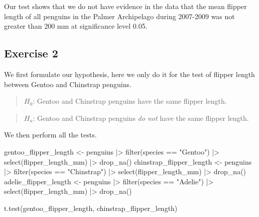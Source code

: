 \documentclass[
  letterpaper,
  DIV=11,
  numbers=noendperiod]{scrreprt}
\newenvironment{Shaded}{\begin{snugshade}}{\end{snugshade}}
\newcommand{\FunctionTok}[1]{\textcolor[rgb]{0.28,0.35,0.67}{#1}}
\newcommand{\NormalTok}[1]{\textcolor[rgb]{0.00,0.23,0.31}{#1}}
\newcommand{\OtherTok}[1]{\textcolor[rgb]{0.00,0.23,0.31}{#1}}
\newcommand{\SpecialCharTok}[1]{\textcolor[rgb]{0.37,0.37,0.37}{#1}}
\newcommand{\StringTok}[1]{\textcolor[rgb]{0.13,0.47,0.30}{#1}}
\begin{document}
Our test shows that we do not have evidence in the data that the mean
flipper length of all penguins in the Palmer Archipelago during
2007-2009 was not greater than 200 mm at significance level 0.05.

\subsection{Exercise 2}\label{exercise-2-17}

We first formulate our hypothesis, here we only do it for the test of
flipper length between Gentoo and Chinstrap penguins.

\begin{quote}
\textbf{\(H_0\)}: Gentoo and Chinstrap penguins have the same flipper
length.
\end{quote}

\begin{quote}
\textbf{\(H_a\)}: Gentoo and Chinstrap penguins \emph{do not} have the
same flipper length.
\end{quote}

We then perform all the tests.

\begin{Shaded}
\begin{Highlighting}[]
\NormalTok{gentoo\_flipper\_length }\OtherTok{\textless{}{-}}\NormalTok{ penguins }\SpecialCharTok{|\textgreater{}}
  \FunctionTok{filter}\NormalTok{(species }\SpecialCharTok{==} \StringTok{"Gentoo"}\NormalTok{) }\SpecialCharTok{|\textgreater{}}
  \FunctionTok{select}\NormalTok{(flipper\_length\_mm) }\SpecialCharTok{|\textgreater{}}
  \FunctionTok{drop\_na}\NormalTok{()}
\NormalTok{chinstrap\_flipper\_length }\OtherTok{\textless{}{-}}\NormalTok{ penguins }\SpecialCharTok{|\textgreater{}}
  \FunctionTok{filter}\NormalTok{(species }\SpecialCharTok{==} \StringTok{"Chinstrap"}\NormalTok{) }\SpecialCharTok{|\textgreater{}}
  \FunctionTok{select}\NormalTok{(flipper\_length\_mm) }\SpecialCharTok{|\textgreater{}}
  \FunctionTok{drop\_na}\NormalTok{()}
\NormalTok{adelie\_flipper\_length }\OtherTok{\textless{}{-}}\NormalTok{ penguins }\SpecialCharTok{|\textgreater{}}
  \FunctionTok{filter}\NormalTok{(species }\SpecialCharTok{==} \StringTok{"Adelie"}\NormalTok{) }\SpecialCharTok{|\textgreater{}}
  \FunctionTok{select}\NormalTok{(flipper\_length\_mm) }\SpecialCharTok{|\textgreater{}}
  \FunctionTok{drop\_na}\NormalTok{()}

\FunctionTok{t.test}\NormalTok{(gentoo\_flipper\_length, chinstrap\_flipper\_length)}
\end{Highlighting}
\end{Shaded}
\end{document}
